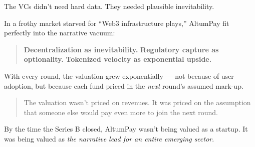 \medskip

The VCs didn’t need hard data.  
They needed plausible inevitability.

In a frothy market starved for ``Web3 infrastructure plays,''  
AltumPay fit perfectly into the narrative vacuum:  
\begin{quote}
\textbf{Decentralization as inevitability.}  
\textbf{Regulatory capture as optionality.}  
\textbf{Tokenized velocity as exponential upside.}
\end{quote}

\medskip

With every round, the valuation grew exponentially --- not because of user adoption, but because each fund priced in the \emph{next} round’s assumed mark-up.

\begin{quote}
The valuation wasn’t priced on revenues.  
It was priced on the assumption that someone else would pay even more to join the next round.
\end{quote}

By the time the Series B closed, AltumPay wasn’t being valued as a startup.  
It was being valued as \emph{the narrative lead for an entire emerging sector}.

